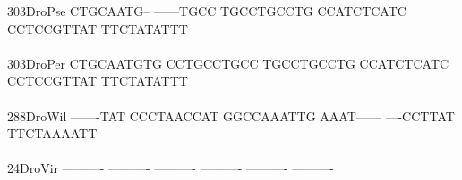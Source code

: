 \documentclass[11pt,twoside,reqno,a4paper]{article}
\begin{document}
{303\hspace*{1\charwidth}DroPse	CTGCAATG--	------TGCC	TGCCTGCCTG	CCATCTCATC	CCTCCGTTAT	TTCTATATTT	\\
\hspace*{4\charwidth}\hspace*{7\charwidth}\hspace*{1\charwidth}\hspace*{1\charwidth}\hspace*{1\charwidth}\hspace*{1\charwidth}\hspace*{1\charwidth}\hspace*{1\charwidth}\\
303\hspace*{1\charwidth}DroPer	CTGCAATGTG	CCTGCCTGCC	TGCCTGCCTG	CCATCTCATC	CCTCCGTTAT	TTCTATATTT	\\
\hspace*{4\charwidth}\hspace*{7\charwidth}\hspace*{1\charwidth}\hspace*{1\charwidth}\hspace*{1\charwidth}\hspace*{1\charwidth}\hspace*{1\charwidth}\hspace*{1\charwidth}\\
288\hspace*{1\charwidth}DroWil	-------TAT	CCCTAACCAT	GGCCAAATTG	AAAT------	----CCTTAT	TTCTAAAATT	\\
\hspace*{4\charwidth}\hspace*{7\charwidth}\hspace*{1\charwidth}\hspace*{1\charwidth}\hspace*{1\charwidth}\hspace*{1\charwidth}\hspace*{1\charwidth}\hspace*{1\charwidth}\\
24\hspace*{2\charwidth}DroVir	----------	----------	----------	----------	----------	----------	\\
\hspace*{4\charwidth}\hspace*{7\charwidth}\hspace*{1\charwidth}\hspace*{1\charwidth}\hspace*{1\charwidth}\hspace*{1\charwidth}\hspace*{1\charwidth}\hspace*{1\charwidth}\\
}
\end{document}

